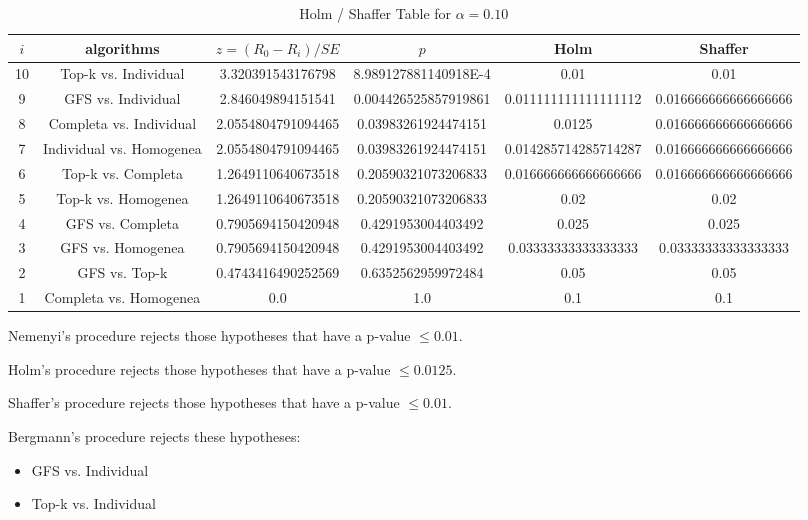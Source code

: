 \documentclass[a4paper,10pt]{article}
\begin{document}
\begin{landscape}
\begin{table}[!htp]
\centering\tiny
\caption{Holm / Shaffer Table for $\alpha=0.10$}
\begin{tabular}{cccccc}
$i$&algorithms&$z=(R_0 - R_i)/SE$&$p$&Holm&Shaffer\\
\hline
10&Top-k vs. Individual&3.320391543176798&8.989127881140918E-4&0.01&0.01\\
9&GFS vs. Individual&2.846049894151541&0.004426525857919861&0.011111111111111112&0.016666666666666666\\
8&Completa vs. Individual&2.0554804791094465&0.03983261924474151&0.0125&0.016666666666666666\\
7&Individual vs. Homogenea&2.0554804791094465&0.03983261924474151&0.014285714285714287&0.016666666666666666\\
6&Top-k vs. Completa&1.2649110640673518&0.20590321073206833&0.016666666666666666&0.016666666666666666\\
5&Top-k vs. Homogenea&1.2649110640673518&0.20590321073206833&0.02&0.02\\
4&GFS vs. Completa&0.7905694150420948&0.4291953004403492&0.025&0.025\\
3&GFS vs. Homogenea&0.7905694150420948&0.4291953004403492&0.03333333333333333&0.03333333333333333\\
2&GFS vs. Top-k&0.4743416490252569&0.6352562959972484&0.05&0.05\\
1&Completa vs. Homogenea&0.0&1.0&0.1&0.1\\
\hline
\end{tabular}
\end{table}
Nemenyi's procedure rejects those hypotheses that have a p-value $\le0.01$.


Holm's procedure rejects those hypotheses that have a p-value $\le0.0125$.


Shaffer's procedure rejects those hypotheses that have a p-value $\le0.01$.


Bergmann's procedure rejects these hypotheses:


\begin{itemize}


\item GFS vs. Individual
\item Top-k vs. Individual
\end{itemize}



\end{landscape}
\end{document}
